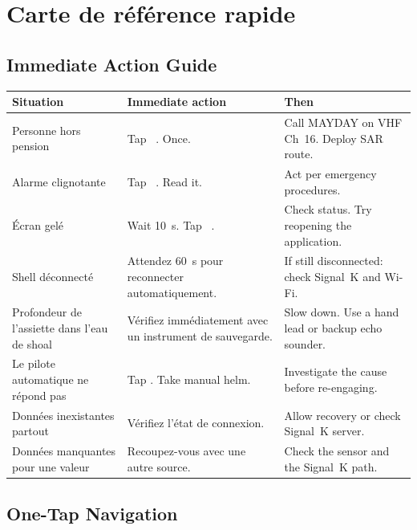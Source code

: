 \chapter{Carte de référence rapide}
\label{ch:quickref}

\section*{Immediate Action Guide}

\begin{longtable}{L{3.6cm}L{4.4cm}L{5.7cm}}
\toprule
{}
\color{white}\sffamily\bfseries Situation &
\color{white}\sffamily\bfseries Immediate action &
\color{white}\sffamily\bfseries Then \\
\midrule
Personne hors pension&
  Tap ~. Once. &
  Call MAYDAY on VHF Ch~16. Deploy SAR route. \\
Alarme clignotante&
  Tap ~. Read it. &
  Act per emergency procedures. \\
Écran gelé&
  Wait 10~s. Tap ~. &
  Check status. Try reopening the application. \\
Shell déconnecté&
Attendez 60~s pour reconnecter automatiquement.&
  If still disconnected: check Signal~K and Wi-Fi. \\
Profondeur de l'assiette dans l'eau de shoal&
Vérifiez immédiatement avec un instrument de sauvegarde.&
  Slow down. Use a hand lead or backup echo sounder. \\
Le pilote automatique ne répond pas&
  Tap . Take manual helm. &
  Investigate the cause before re-engaging. \\
Données inexistantes partout&
Vérifiez l'état de connexion.&
  Allow recovery or check Signal~K server. \\
Données manquantes pour une valeur&
Recoupez-vous avec une autre source.&
  Check the sensor and the Signal~K path. \\
\bottomrule
\end{longtable}

\section*{One-Tap Navigation}

